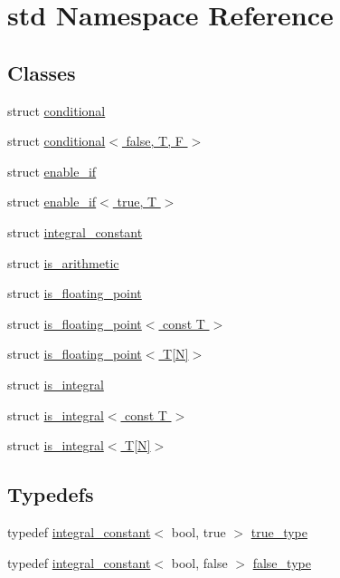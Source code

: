 \hypertarget{namespacestd}{}\section{std Namespace Reference}
\label{namespacestd}
\subsection*{Classes}
\begin{DoxyCompactItemize}
\item 
struct \hyperlink{structstd_1_1conditional}{conditional}
\item 
struct \hyperlink{structstd_1_1conditional_3_01false_00_01T_00_01F_01_4}{conditional$<$ false, T, F $>$}
\item 
struct \hyperlink{structstd_1_1enable__if}{enable\+\_\+if}
\item 
struct \hyperlink{structstd_1_1enable__if_3_01true_00_01T_01_4}{enable\+\_\+if$<$ true, T $>$}
\item 
struct \hyperlink{structstd_1_1integral__constant}{integral\+\_\+constant}
\item 
struct \hyperlink{structstd_1_1is__arithmetic}{is\+\_\+arithmetic}
\item 
struct \hyperlink{structstd_1_1is__floating__point}{is\+\_\+floating\+\_\+point}
\item 
struct \hyperlink{structstd_1_1is__floating__point_3_01const_01T_01_4}{is\+\_\+floating\+\_\+point$<$ const T $>$}
\item 
struct \hyperlink{structstd_1_1is__floating__point_3_01T[N]_4}{is\+\_\+floating\+\_\+point$<$ T\mbox{[}\+N\mbox{]}$>$}
\item 
struct \hyperlink{structstd_1_1is__integral}{is\+\_\+integral}
\item 
struct \hyperlink{structstd_1_1is__integral_3_01const_01T_01_4}{is\+\_\+integral$<$ const T $>$}
\item 
struct \hyperlink{structstd_1_1is__integral_3_01T[N]_4}{is\+\_\+integral$<$ T\mbox{[}\+N\mbox{]}$>$}
\end{DoxyCompactItemize}
\subsection*{Typedefs}
\begin{DoxyCompactItemize}
\item 
typedef \hyperlink{structstd_1_1integral__constant}{integral\+\_\+constant}$<$ bool, true $>$ \hyperlink{namespacestd_a6a860513044e23d34e553ea986e83fa1}{true\+\_\+type}
\item 
typedef \hyperlink{structstd_1_1integral__constant}{integral\+\_\+constant}$<$ bool, false $>$ \hyperlink{namespacestd_aebe6729ab5488ecc76c762873d226857}{false\+\_\+type}
\end{DoxyCompactItemize}
